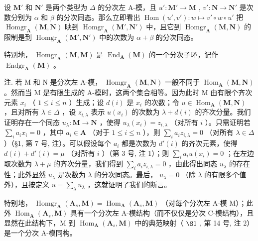 设 \(\mathbf{M}'\) 和 \(\mathbf{N}'\) 是两个类型为 \(\Delta\) 的分次左 A-模，且 \(u':\mathbf{M}'\to\mathbf{M}\) , \(v':\mathbf{N}\to\mathbf{N}'\) 是次数分别为 \(\alpha\) 和 \(\beta\) 的分次同态。那么立即看出 \(\operatorname{Hom}(u',v')\colon w\mapsto v'\circ w\circ u'\) 把 \(\operatorname{Homgr}_{\mathbf{A}}(\mathbf{M},\mathbf{N})\) 映到 \(\operatorname{Homgr}_{\mathbf{A}}(\mathbf{M}',\mathbf{N}')\) 中，且它到 \(\operatorname{Homgr}_{\mathbf{A}}(\mathbf{M},\mathbf{N})\) 的限制是到 \(\operatorname{Homgr}_{\mathbf{A}}(\mathbf{M}',\mathbf{N}')\) 中的次数为 \(\alpha+\beta\) 的分次同态。

特别地， \(\operatorname{Homgr}_{\mathbf{A}}(\mathbf{M}, \mathbf{M})\) 是 \(\operatorname{End}_{\mathbf{A}}(\mathbf{M})\) 的一个分次子环，记作 \(\operatorname{Endgr}_{\mathbf{A}}(\mathbf{M})\) 。

注. 若 M 和 N 是分次左 A-模， \(\operatorname{Homgr}_{\mathbf{A}}(\mathbf{M}, \mathbf{N})\) 一般不同于 \(\operatorname{Hom}_{\mathbf{A}}(\mathbf{M}, \mathbf{N})\) 。然而当 M 是有限生成的 A-模时，这两个集合相等。因为此时 M 由有限个齐次元素 \(x_{i}\) （ \(1 \leqslant i \leqslant n\) ）生成；设 \(d(i)\) 是 \(x_{i}\) 的次数；令 \(u \in \operatorname{Hom}_{\mathbf{A}}(\mathbf{M}, \mathbf{N})\) ，且对所有 \(\lambda \in \Delta\) ，设 \(z_{i,\lambda}\) 表示 \(u(x_{i})\) 的次数为 \(\lambda + d(i)\) 的齐次分量。我们证明存在一个同态 \(u_{\lambda}: \mathbf{M} \to \mathbf{N}\) ，使得 \(u_{\lambda}(x_{i}) = z_{i,\lambda}\) （对所有 \(i\) ）。只需证明若 \(\sum_{i} a_{i} x_{i} = 0\) ，其中 \(a_{i} \in \mathbf{A}\) （对于 \(1 \leqslant i \leqslant n\) ），则 \(\sum_{i} a_{i} z_{i,\lambda} = 0\) （对所有 \(\lambda \in \Delta\) ）（§1, 第 7 号, 注）。可以假设每个 \(a_{i}\) 都是次数为 \(d'(i)\) 的齐次元素，使得 \(d(i) + d'(i) = \mu\) （对所有 \(i\) ）（第 3 号, 注 1）；则 \(\sum_{i} a_{i} u(x_{i}) = 0\) ；在左边取次数为 \(\lambda + \mu\) 的齐次分量，我们得到 \(\sum_{i} a_{i} z_{i,\lambda} = 0\) ，由此得出同态 \(u_{\lambda}\) 的存在性；此外显然 \(u_{\lambda}\) 是次数为 \(\lambda\) 的分次同态。最后， \(u_{\lambda} = 0\) （除 \(\lambda\) 的有限多个值外），且按定义 \(u = \sum_{\lambda} u_{\lambda}\) ，这就证明了我们的断言。

特别地， \(\operatorname{Homgr}_{\mathbf{A}}(\mathbf{A}_s, \mathbf{M}) = \operatorname{Hom}_{\mathbf{A}}(\mathbf{A}_s, \mathbf{M})\) （对每个分次左 A-模 M）；此外 \(\operatorname{Hom}_{\mathbf{A}}(\mathbf{A}_s, \mathbf{M})\) 具有一个分次左 A-模结构（而不仅仅是分次 C-模结构），且显然在此结构下，M 到 \(\operatorname{Hom}_{\mathbf{A}}(\mathbf{A}_s, \mathbf{M})\) 中的典范映射（ \(\S 1\) , 第 14 号, 注 2）是一个分次 A-模同构。

